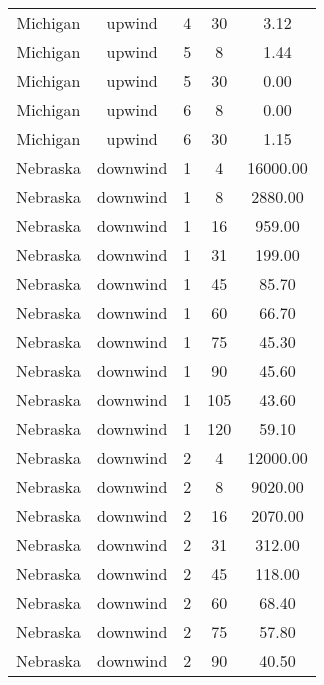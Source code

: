 \documentclass{article}
\begin{document}
\begin{longtable}[H]{ccccc}
Michigan  & upwind    & 4        & 30           & 3.12                    \\
Michigan  & upwind    & 5        & 8            & 1.44                    \\
Michigan  & upwind    & 5        & 30           & 0.00                    \\
Michigan  & upwind    & 6        & 8            & 0.00                    \\
Michigan  & upwind    & 6        & 30           & 1.15                    \\
Nebraska  & downwind  & 1        & 4            & 16000.00                \\
Nebraska  & downwind  & 1        & 8            & 2880.00                 \\
Nebraska  & downwind  & 1        & 16           & 959.00                  \\
Nebraska  & downwind  & 1        & 31           & 199.00                  \\
Nebraska  & downwind  & 1        & 45           & 85.70                   \\
Nebraska  & downwind  & 1        & 60           & 66.70                   \\
Nebraska  & downwind  & 1        & 75           & 45.30                   \\
Nebraska  & downwind  & 1        & 90           & 45.60                   \\
Nebraska  & downwind  & 1        & 105          & 43.60                   \\
Nebraska  & downwind  & 1        & 120          & 59.10                   \\
Nebraska  & downwind  & 2        & 4            & 12000.00                \\
Nebraska  & downwind  & 2        & 8            & 9020.00                 \\
Nebraska  & downwind  & 2        & 16           & 2070.00                 \\
Nebraska  & downwind  & 2        & 31           & 312.00                  \\
Nebraska  & downwind  & 2        & 45           & 118.00                  \\
Nebraska  & downwind  & 2        & 60           & 68.40                   \\
Nebraska  & downwind  & 2        & 75           & 57.80                   \\
Nebraska  & downwind  & 2        & 90           & 40.50                   \\

\end{longtable}
\end{document}
